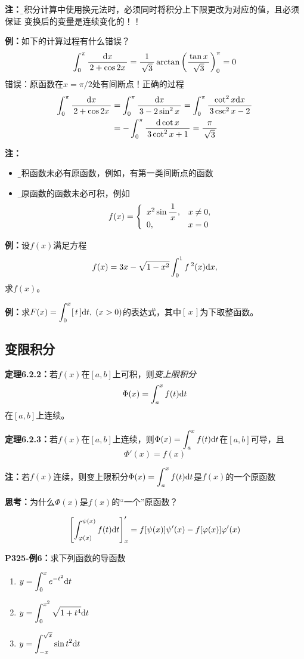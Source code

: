 {\bf 注：}{\b 定积分计算中使用换元法时，必须同时将积分上下限更改为对应的值，且必须保证
变换后的变量是连续变化的！！}

{\bf 例：}如下的计算过程有什么错误？
$$\displaystyle\int_0^{\pi}\displaystyle\frac{\,{\mathrm{d} x}\,}{\,{2+\cos2x}\,}=\displaystyle\frac{\,{1}\,}{\,{\sqrt3}\,}\arctan
\left(\displaystyle\frac{\,{\tan x}\,}{\,{\sqrt3}\,}\right)_0^{\pi}=0$$
错误：原函数在$x=\pi/2$处有间断点！正确的过程
\begin{align}
	\displaystyle\int_0^{\pi}\displaystyle\frac{\,{\mathrm{d} x}\,}{\,{2+\cos2x}\,}&=\displaystyle\int_0^{\pi}\displaystyle\frac{\,{\mathrm{d} x}\,}{\,{3-2\sin^2x}\,}=\displaystyle\int_0^{\pi}\displaystyle\frac{\,{\cot^2x\mathrm{d} x}\,}{\,{3\csc^2x-2}\,}\notag\\
	&=-\displaystyle\int_0^{\pi}\displaystyle\frac{\,{\mathrm{d}\cot x}\,}{\,{3\cot^2x+1}\,}=\displaystyle\frac{\,{\pi}\,}{\,{\sqrt3}\,}\notag
\end{align}

{\bf 注：}
\begin{itemize}
  \setlength{\itemindent}{1cm}
  \item {\b 可积函数未必有原函数}，例如，有第一类间断点的函数
  \item {\b 有原函数的函数未必可积}，例如
  $$f(x)=\left\{\begin{array}{ll}
  x^2\sin\displaystyle\frac{\,{1}\,}{\,{x}\,},& x\ne0,\\ 0,& x=0
  \end{array}\right.$$
\end{itemize}

{\bf 例：}设$f(x)$满足方程
$$f(x)=3x-\sqrt{1-x^2}\displaystyle\int_0^1f\,^2(x)\mathrm{d} x,$$
求$f(x)$。

{\bf 例：}求$F(x)=\displaystyle\int_0^x[\,t\,]\mathrm{d} t,\;(x>0)$的表达式，其中$[\,x\,]$为下取整函数。

\subsection{变限积分}

{\bf 定理6.2.2：}若$f(x)$在$[a,b]$上可积，则{\it 变上限积分}
$$\Phi(x)=\displaystyle\int_a^xf(t)\mathrm{d} t$$
在$[a,b]$上连续。

{\bf 定理6.2.3：}若$f(x)$在$[a,b]$上连续，则$\Phi(x)=\displaystyle\int_a^xf(t)\mathrm{d} t$在$[a,b]$可导，且
$$\Phi'(x)=f(x)$$

{\bf 注：}若$f(x)$连续，则变上限积分$\Phi(x)=\displaystyle\int_a^xf(t)\mathrm{d} t$是$f(x)$的一个原函数

{\bf 思考：}为什么$\Phi(x)$是$f(x)$的“一个”原函数？

$${\left[\displaystyle\int_{\varphi(x)}^{\psi(x)}f(t)\mathrm{d} t\right]'_x
	=f[\psi(x)]\psi'(x)-f[\varphi(x)]\varphi'(x)}$$

{\bf P325-例6：}求下列函数的导函数
\begin{enumerate}[(1)]
  \setlength{\itemindent}{1cm}
  \item $y=\displaystyle\int_0^{x}e^{-t^2}\mathrm{d} t$
  \item $y=\displaystyle\int_0^{x^2}\sqrt{1+t^4}\mathrm{d} t$
  \item $y=\displaystyle\int_{-x}^{\sqrt x}\sin t^2\mathrm{d} t$
\end{enumerate}

